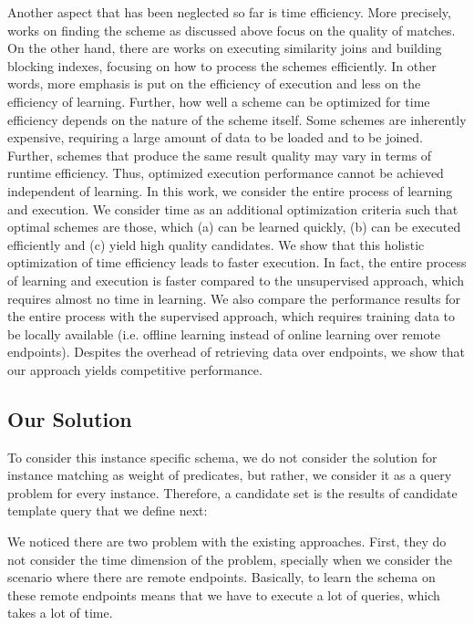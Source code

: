 Another aspect that has been neglected so far is time efficiency. More precisely, works on finding the scheme as discussed above focus on the quality of matches. On the other hand, there are works on executing similarity joins and building blocking indexes, focusing on how to process the schemes efficiently. In other words, more emphasis is put on the efficiency of execution and less on the efficiency of learning.  Further, how well a scheme can be optimized for time efficiency depends on the nature of the scheme itself. Some schemes are inherently expensive, requiring a large amount of data to be loaded and to be joined. Further, schemes that produce the same result quality may vary in terms of runtime efficiency. Thus, optimized execution performance cannot be achieved independent of learning. In this work, we consider the entire process of learning and execution. We consider time as an additional optimization criteria such that optimal schemes are those, which (a) can be learned quickly, (b) can be executed efficiently and (c) yield high quality candidates. We show that this holistic optimization of time efficiency leads to faster execution. In fact, the entire process of learning and execution is faster compared to the unsupervised approach, which requires almost no time in learning. We also compare the performance results for the entire process with the supervised approach, which requires training data to be locally available (i.e. offline learning instead of online learning over remote endpoints). Despites the overhead of retrieving data over endpoints, we show that our approach yields competitive performance. 


\subsection{Our Solution}
To consider this instance specific schema, we do not consider the solution for instance matching as weight of predicates, but rather, we consider it as a query problem for every instance. Therefore, a candidate set is the results of candidate template query that we define next:



We noticed there are two problem with the existing approaches. First, they do not consider the time dimension of the problem, specially when we consider the scenario where there are remote endpoints. Basically, to learn the schema on these remote endpoints means that we have to execute a lot of queries, which takes a lot of time. 

